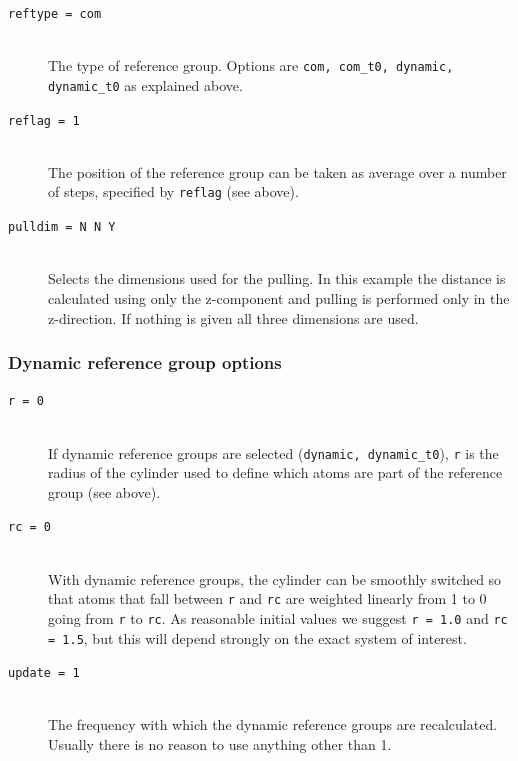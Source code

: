\begin{description}
\item[\tt reftype                  = com]\mbox{}\\
The type of reference group. Options are {\tt com, com\_t0, dynamic,
dynamic\_t0} as explained above. 

\item[\tt reflag                   = 1]\mbox{}\\
The position of the reference group can be taken as average over a
number of steps, specified by {\tt reflag} (see above).

\item[\tt pulldim                  = N N Y]\mbox{}\\
Selects the dimensions used for the pulling.
In this example the distance is calculated using only the z-component
and pulling is performed only in the z-direction.
If nothing is given all three dimensions are used.

\end{description}

\subsubsection{Dynamic reference group options}

\begin{description}

\item[\tt r                        = 0]\mbox{}\\
If dynamic reference groups are selected ({\tt dynamic, dynamic\_t0}),
{\tt r} is the radius of the cylinder used to define which atoms are
part of the reference group (see above).

\item[\tt rc                       = 0]\mbox{}\\
With dynamic reference groups, the cylinder can be smoothly switched
so that atoms that fall between {\tt r} and {\tt rc} are weighted
linearly from 1 to 0 going from {\tt r} to {\tt rc}. As reasonable
initial values we suggest {\tt r = 1.0} and {\tt rc = 1.5}, but this
will depend strongly on the exact system of interest.

\item[\tt update                   = 1]\mbox{}\\
The frequency with which the dynamic reference groups are
recalculated. Usually there is no reason to use anything other than 1.

\end{description}

